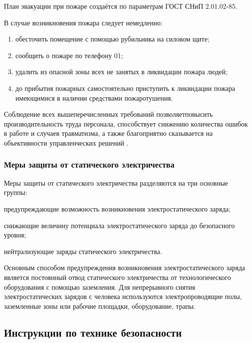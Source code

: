 План эвакуации при пожаре создаётся по параметрам ГОСТ СНиП 2.01.02-85.

В случае возникновения пожара следует немедленно:
\begin{enumerate}
\item обесточить помещение с помощью рубильника на силовом щите;
\item сообщить о пожаре по телефону 01;
\item удалить из опасной зоны всех не занятых в ликвидации пожара людей;
\item до прибытия пожарных самостоятельно приступить к ликвидации пожара имеющимися в наличии средствами пожаротушения.
\end{enumerate}

Соблюдение всех вышеперечисленных требований позволяетповысить производительность труда персонала, способствует снижению количества ошибок в работе и случаев травматизма, а также благоприятно сказывается на объективности управленческих решений \cite{bhzd_1}.

\subsubsection{Меры защиты от статического электричества}
Меры защиты от статического электричества разделяются на три основные группы:
\item предупреждающие возможность возникновения электростатического заряда;
\item снижающие величину потенциала электростатического заряда до безопасного уровня;
\item нейтрализующие заряды статического электричества.

Основным способом предупреждения возникновения электростатического заряда является постоянный отвод статического электричества от технологического оборудования с помощью заземления. Для непрерывного снятия электростатических зарядов с человека используются электропроводящие полы, заземленные зоны или рабочие площадки, оборудование, трапы.

\subsection{Инструкции по технике безопасности}
